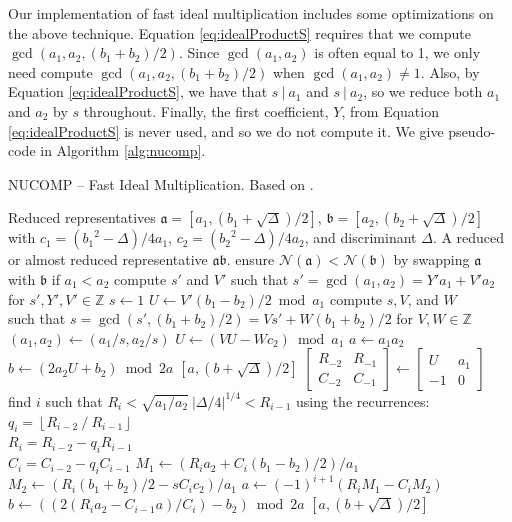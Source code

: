 \documentclass{ucalgthes1}
\theoremstyle{definition}
\newcommand{\ZZ}{\mathbb{Z}}
\newcommand{\matrixtt}[4]{\left[ \begin{array}{rr} #1 & #2 \\ #3 & #4 \end{array} \right]}
\newcommand{\floor}[1]{\left\lfloor #1 \right\rfloor}
\begin{document}
Our implementation of fast ideal multiplication includes some optimizations on the above technique.  Equation \ref{eq:idealProductS} requires that we compute $\gcd(a_1, a_2, (b_1 + b_2)/2)$. Since $\gcd(a_1, a_2)$ is often equal to 1, we only need compute $\gcd(a_1, a_2, (b_1 + b_2)/2)$ when $\gcd(a_1, a_2) \neq 1$. Also, by Equation \ref{eq:idealProductS}, we have that $s ~|~ a_1$ and $s ~|~ a_2$, so we reduce both $a_1$ and $a_2$ by $s$ throughout. Finally, the first coefficient, $Y$, from Equation \ref{eq:idealProductS} is never used, and so we do not compute it. We give pseudo-code in Algorithm \ref{alg:nucomp}. 

\begin{algorithm}[h]
\caption{NUCOMP -- Fast Ideal Multiplication. Based on \cite[pp.441-443]{Jacobson2009}.}
\label{alg:nucomp}
\begin{algorithmic}[1]
\REQUIRE Reduced representatives $\mathfrak a = [a_1, (b_1+\sqrt\Delta)/2]$, $\mathfrak b = [a_2, (b_2+\sqrt\Delta)/2]$ \\ with $c_1 = ({b_1}^2-\Delta)/4a_1$, $c_2 = ({b_2}^2-\Delta)/4a_2$, and discriminant $\Delta$.
\ENSURE A reduced or almost reduced representative $\mathfrak a \mathfrak b$.
\STATE ensure $\mathcal N(\mathfrak a) < \mathcal N(\mathfrak b)$ by swapping $\mathfrak a$ with $\mathfrak b$ if $a_1 < a_2$
\STATE compute $s'$ and $V'$ such that $s' = \gcd(a_1, a_2) = Y'a_1 + V'a_2$ for $s', Y', V' \in \ZZ$
\STATE $s \gets 1$
\STATE $U \gets V'(b_1 - b_2)/2 \bmod a_1$
	\STATE compute $s, V$, and $W$ \\
	       such that $s = \gcd(s', (b_1 + b_2)/2) = Vs' + W(b_1 + b_2)/2$ for $V, W \in \ZZ$
	\STATE $(a_1, a_2) \gets (a_1/s, a_2/s)$
	\STATE $U \gets (VU - Wc_2) \bmod a_1$
\ENDIF
{}
	\STATE $a \gets a_1a_2$
	\STATE $b \gets (2a_2U + b_2) \bmod{2a}$
	\RETURN $[a, (b+\sqrt\Delta)/2]$
\ENDIF
\STATE $\matrixtt{R_{-2}}{R_{-1}}{C_{-2}}{C_{-1}} \gets \matrixtt{U}{a_1}{-1}{0}$
\STATE find $i$ such that $R_i < \sqrt{a_1/a_2} ~ |\Delta/4|^{1/4} < R_{i-1}$ using the recurrences: \\
$q_i = \floor{R_{i-2} ~/~ R_{i-1}}$ \\
$R_i = R_{i-2}-q_i R_{i-1}$ \\
$C_i=C_{i-2}-q_i C_{i-1}$
\STATE $M_1 \gets (R_i a_2 + C_i(b_1-b_2)/2)/a_1$
\STATE $M_2 \gets (R_i (b_1+b_2)/2 -sC_i c_2)/a_1$
\STATE $a \gets (-1)^{i+1}(R_i M_1 - C_i M_2)$
\STATE $b \gets ((2(R_i a_2 - C_{i-1} a)/C_i) - b_2) \bmod{2a}$
\RETURN $[a, (b+\sqrt\Delta)/2]$
\end{algorithmic}
\end{algorithm}
\end{document}

